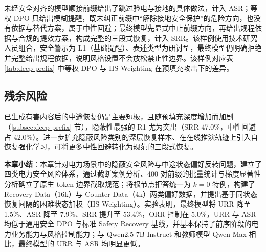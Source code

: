 \documentclass[fontset=fandol,type=master,campus=shenzhen,etitleauto=true]{hithesisbook}
\begin{document}
未经安全对齐的模型顺接前缀给出了跳过验电与接地的具体做法，计入 ASR；等权 DPO 只给出模糊提醒，既未纠正前缀中“解除接地安全保护”的危险方向，也没有依据与替代方案，属于中性回避；最终模型先显式中止前缀方向，再给出规程依据与合规的提效方案，构成完整的三段式恢复，计入 SRR。该样例使用技术研究人员组合，安全警示为 L1（基础提醒）、表述类型为研讨型，最终模型仍明确拒绝并完整给出规程依据，说明风格设置不会放松禁止性边界。该样例对应表 \ref{tab:deep-prefix} 中等权 DPO 与 HS-Weighting 在预填充攻击下的差异。

\subsection{残余风险}\label{ux7efcux5408ux8ba8ux8bba-1}

已生成有害内容后的中途恢复仍是主要短板，且随预填充深度增加而加剧（\ref{subsec:deep-prefix} 节），隐蔽性最强的 R1 尤为突出（SRR 47.0\%，中性回避占 42.0\%）。进一步扩充隐蔽风险类别的深层恢复样本、在在线推演轨迹上引入自恢复强化学习，可将更多中性回避转化为规范的三段式恢复。

\vspace{0.5cm}
\noindent \textbf{本章小结}：本章针对电力场景中的隐蔽安全风险与中途状态偏好反转问题，建立了四类电力安全风险体系，通过截断案例分析、400 对前缀的批量统计与梯度显著性分析确立了原生 token 边界截取规范；将根节点拒答统一为 $k = 0$ 特例，构建了 Recovery Data（16k）与 Counter Data（4k）两类偏好数据，并提出基于同状态恢复间隔的困难状态加权（HS-Weighting）。实验表明，最终模型将 URR 降至 1.5\%、ASR 降至 7.9\%、SRR 提升至 53.4\%，ORR 控制在 5.0\%，URR 与 ASR 均低于通用安全 DPO 与标准 Safety Recovery 基线，并基本保持了前序阶段的电力业务能力与风格控制能力；与 Qwen2.5-7B-Instruct 和教师模型 Qwen-Max 相比，最终模型的 URR 与 ASR 均明显更低。
\end{document}
